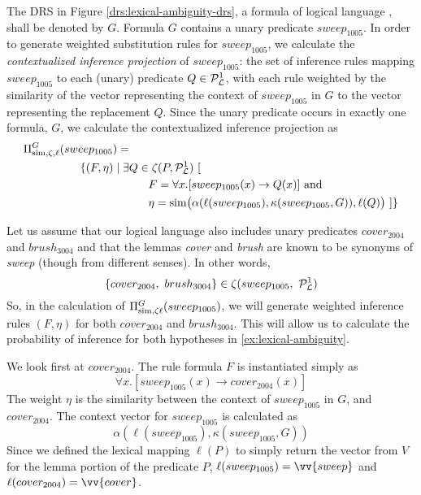 The DRS in Figure \ref{drs:lexical-ambiguity-drs}, a formula of logical language
\loglang, shall be denoted by $G$.  Formula $G$ contains a unary predicate
$sweep_{1005}$.  In order to generate weighted substitution rules for
$sweep_{1005}$, we calculate the {\it contextualized inference projection} of
$sweep_{1005}$: the set of inference rules mapping $sweep_{1005}$ to each
(unary) predicate $Q \in {\cal{P}}_{{\cal{L}}}^1$, with each rule weighted by the
similarity of the vector representing the context of $sweep_{1005}$ in $G$ to
the vector representing the replacement $Q$. Since the unary predicate  occurs
in exactly one formula, $G$, we calculate the contextualized inference
projection as
\begin{align*}
&\Pi^G_{\simfunc, \zeta, \ell}(sweep_{1005}) = \\
& \hspace{50px} \{ (F, \eta) \mid \exists Q \in \zeta(P, \predsym{\loglang}^1)~[ \\
& \hspace{110px} F = \forall x.[sweep_{1005}(x) \to Q(x)] \text{ and } \\
& \hspace{110px} \eta = \simfunc\big(\alpha(\ell(sweep_{1005}), \kappa(sweep_{1005}, G)), \ell(Q)\big)~] \}
\end{align*}

Let us assume that our logical language \loglang also includes unary predicates
$cover_{2004}$ and $brush_{3004}$ and that the lemmas {\it cover} and {\it
brush} are known to be synonyms of {\it sweep} (though from different senses). 
In other words, \[ \{ cover_{2004},~ brush_{3004} \} \in \zeta(sweep_{1005},~
{\cal{P}}_{{\cal{L}}}^1) \] So, in the calculation of $\Pi^G_{\mathrm{sim},\zeta
\ell}(sweep_{1005})$, we will generate weighted inference rules $(F,\eta)$ for
both $cover_{2004}$ and $brush_{3004}$.  This will allow us to calculate the
probability of inference for both hypotheses in \eqref{ex:lexical-ambiguity}.

We look first at $cover_{2004}$.  The rule formula $F$ is instantiated simply as
\[ \forall x.[sweep_{1005}(x) \to cover_{2004}(x)] \]  The weight $\eta$ is the
similarity between the context of $sweep_{1005}$ in $G$, and $cover_{2004}$.
The context vector for $sweep_{1005}$ is calculated as \[
\alpha(\ell(sweep_{1005}), \kappa(sweep_{1005}, G)) \]  Since we defined the
lexical mapping $\ell(P)$ to simply return the vector from $V$ for the lemma
portion of the predicate $P$, $\ell(sweep_{1005}) = \vv{sweep}$ and
$\ell(cover_{2004}) = \vv{cover}$.  

